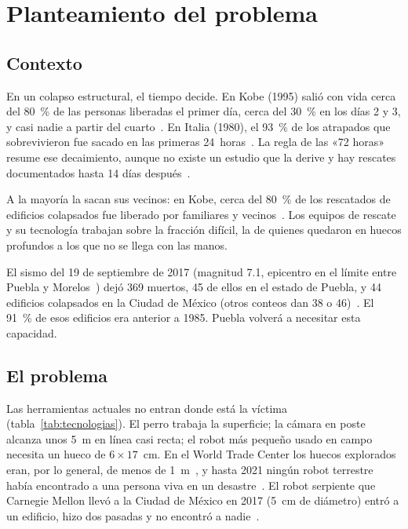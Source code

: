 \section{Planteamiento del problema}

\subsection{Contexto}

En un colapso estructural, el tiempo decide. En Kobe (1995) salió con vida cerca del
80~\% de las personas liberadas el primer día, cerca del 30~\% en los días 2 y 3, y casi
nadie a partir del cuarto~\cite{kawata}. En Italia (1980), el 93~\% de los atrapados que
sobrevivieron fue sacado en las primeras 24~horas~\cite{noji}. La regla de las «72 horas»
resume ese decaimiento, aunque no existe un estudio que la derive y hay rescates
documentados hasta 14 días después~\cite{macintyre}.

A la mayoría la sacan sus vecinos: en Kobe, cerca del 80~\% de los rescatados de edificios
colapsados fue liberado por familiares y vecinos~\cite{japon2014}. Los equipos de rescate
y su tecnología trabajan sobre la fracción difícil, la de quienes quedaron en huecos
profundos a los que no se llega con las manos.

El sismo del 19 de septiembre de 2017 (magnitud 7.1, epicentro en el límite entre Puebla
y Morelos~\cite{ssn2017}) dejó 369 muertos, 45 de ellos en el estado de Puebla, y 44
edificios colapsados en la Ciudad de México (otros conteos dan 38 o 46)~\cite{galvis2020}.
El 91~\% de esos edificios era anterior a 1985. Puebla volverá a necesitar esta capacidad.

\subsection{El problema}

Las herramientas actuales no entran donde está la víctima (tabla~\ref{tab:tecnologias}).
El perro trabaja la superficie; la cámara en poste alcanza unos 5~m en línea casi recta; el
robot más pequeño usado en campo necesita un hueco de $6\times17$~cm. En el World Trade
Center los huecos explorados eran, por lo general, de menos de 1~m~\cite{murphy2004}, y
hasta 2021 ningún robot terrestre había encontrado a una persona viva en un
desastre~\cite{murphy2021}. El robot serpiente que Carnegie Mellon llevó a la Ciudad de
México en 2017 (5~cm de diámetro) entró a un edificio, hizo dos pasadas y no encontró a
nadie~\cite{whitman2018}.

